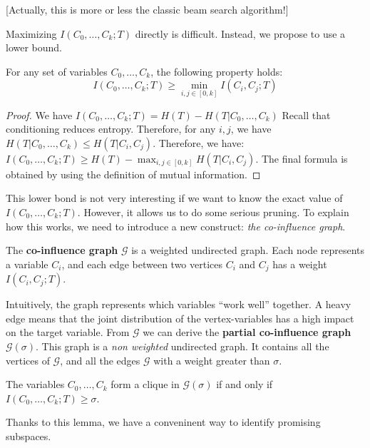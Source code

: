 [Actually, this is more or less the classic beam search algorithm!]

Maximizing $I(C_0, \ldots, C_k; T)$ directly is difficult.  Instead, we propose
to use a lower bound.

\begin{lemma}
    For any set of variables $C_0, \ldots, C_k$, the following property holds:
    $$
    I(C_0, \ldots, C_k; T) \geq \min_{i,j\in [0,k]} I(C_i, C_j ; T)
    $$
\end{lemma}

\begin{proof}
    We have $I(C_0, \ldots, C_k; T) = H(T) - H(T|C_0, \ldots, C_k)$ Recall that
    conditioning reduces entropy. Therefore, for any $i,j$, we have $H(T|C_0,
    \ldots, C_k) \leq H(T |C_i, C_j)$. Therefore, we have:
    $I(C_0, \ldots, C_k; T) \geq H(T) - \max_{i,j\in [0,k]} H(T | C_i, C_j)$.
    The final formula is obtained by using the definition of mutual
    information.
\end{proof}

This lower bond is not very interesting if we want to know the exact value of
$I(C_0, \ldots, C_k; T)$. However, it allows us to do some serious pruning.
To explain how this works, we need to introduce a new construct: \emph{the
co-influence graph}.

\begin{definition}
    The \textbf{co-influence graph} $\mathcal{G}$ is a weighted undirected
    graph. Each node represents a variable $C_i$, and each edge between two
    vertices $C_i$ and $C_j$ has a weight $I(C_i, C_j ; T)$.
\end{definition}

Intuitively, the graph represents which variables ``work well'' together. A
heavy edge means that the joint distribution of the vertex-variables has a high impact on
the target variable. From $\mathcal{G}$ we can derive the \textbf{partial
co-influence graph} $\mathcal{G}(\sigma)$. This graph is a \emph{non weighted}
undirected graph. It contains all the vertices of $\mathcal{G}$, and all the
edges $\mathcal{G}$ with a weight greater than $\sigma$.

\begin{lemma}
    The variables $C_0, \ldots, C_k$ form a clique in $\mathcal{G}(\sigma)$ if
    and only if $ I(C_0, \ldots, C_k; T) \geq \sigma$.
\end{lemma}

Thanks to this lemma, we have a conveninent way to identify promising subspaces.
